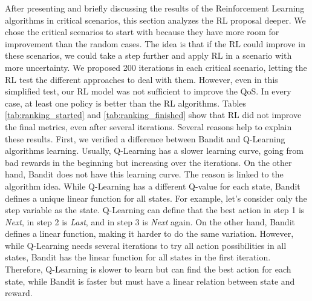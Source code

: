 After presenting and briefly discussing the results of the Reinforcement Learning algorithms in critical scenarios, this section analyzes the RL proposal deeper. We chose the critical scenarios to start with because they have more room for improvement than the random cases. The idea is that if the RL could improve in these scenarios, we could take a step further and apply RL in a scenario with more uncertainty. We proposed 200 iterations in each critical scenario, letting the RL test the different approaches to deal with them. However, even in this simplified test, our RL model was not sufficient to improve the QoS. In every case, at least one policy is better than the RL algorithms. Tables \ref{tab:ranking_started} and \ref{tab:ranking_finished} show that RL did not improve the final metrics, even after several iterations. Several reasons help to explain these results. First, we verified a difference between Bandit and Q-Learning algorithms learning. Usually, Q-Learning has a slower learning curve, going from bad rewards in the beginning but increasing over the iterations. On the other hand, Bandit does not have this learning curve. The reason is linked to the algorithm idea. While Q-Learning has a different Q-value for each state, Bandit defines a unique linear function for all states. For example, let's consider only the step variable as the state. Q-Learning can define that the best action in step 1 is \emph{Next}, in step 2 is \emph{Last}, and in step 3 is \emph{Next} again. On the other hand, Bandit defines a linear function, making it harder to do the same variation. However, while Q-Learning needs several iterations to try all action possibilities in all states, Bandit has the linear function for all states in the first iteration. Therefore, Q-Learning is slower to learn but can find the best action for each state, while Bandit is faster but must have a linear relation between state and reward. 


